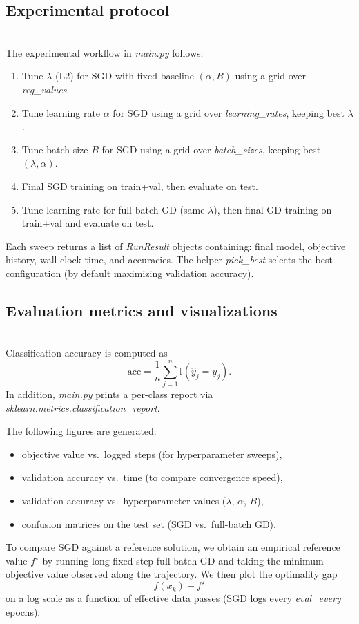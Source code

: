 \subsection{Experimental protocol}\;\\
The experimental workflow in \emph{main.py} follows:
\begin{enumerate}
    \item Tune $\lambda$ (L2) for SGD with fixed baseline $(\alpha,B)$ using a grid over \emph{reg\_values}.
    \item Tune learning rate $\alpha$ for SGD using a grid over \emph{learning\_rates}, keeping best $\lambda$.
    \item Tune batch size $B$ for SGD using a grid over \emph{batch\_sizes}, keeping best $(\lambda,\alpha)$.
    \item Final SGD training on train+val, then evaluate on test.
    \item Tune learning rate for full-batch GD (same $\lambda$), then final GD training on train+val and evaluate on test.
\end{enumerate}

Each sweep returns a list of \emph{RunResult} objects containing:
final model, objective history, wall-clock time, and accuracies.
The helper \emph{pick\_best} selects the best configuration (by default maximizing validation accuracy).

\subsection{Evaluation metrics and visualizations}\;\\
Classification accuracy is computed as
\[
\mathrm{acc}=\frac{1}{n}\sum_{j=1}^n \mathbb{I}(\hat{y}_j=y_j).
\]
In addition, \emph{main.py} prints a per-class report via \emph{sklearn.metrics.classification\_report}.

The following figures are generated:
\begin{itemize}
    \item objective value vs.\ logged steps (for hyperparameter sweeps),
    \item validation accuracy vs.\ time (to compare convergence speed),
    \item validation accuracy vs.\ hyperparameter values ($\lambda$, $\alpha$, $B$),
    \item confusion matrices on the test set (SGD vs.\ full-batch GD).
\end{itemize}

To compare SGD against a reference solution, we obtain an empirical reference value $f^\star$ by running long fixed-step full-batch GD and taking the minimum objective value observed along the trajectory. We then plot the optimality gap
\[
f(x_k)-f^\star
\]
on a log scale as a function of effective data passes (SGD logs every \emph{eval\_every} epochs).